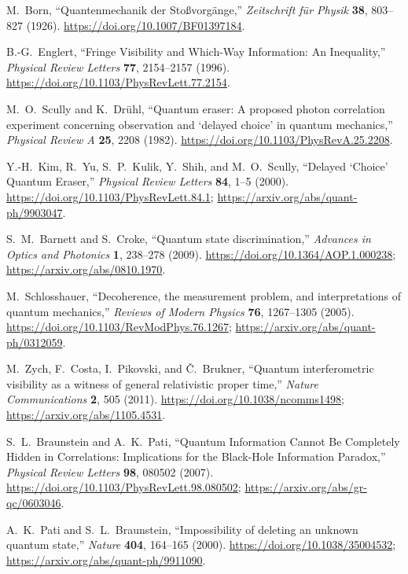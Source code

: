 M.~Born, ``Quantenmechanik der Sto{\ss}vorg{\"a}nge,''
\emph{Zeitschrift f{\"u}r Physik} \textbf{38}, 803--827 (1926).
\url{https://doi.org/10.1007/BF01397184}.

B.-G.~Englert, ``Fringe Visibility and Which-Way Information: An Inequality,''
\emph{Physical Review Letters} \textbf{77}, 2154--2157 (1996).
\url{https://doi.org/10.1103/PhysRevLett.77.2154}.

M.~O.~Scully and K.~Dr{\"u}hl, ``Quantum eraser: A proposed photon correlation experiment concerning observation and `delayed choice' in quantum mechanics,''
\emph{Physical Review A} \textbf{25}, 2208 (1982).
\url{https://doi.org/10.1103/PhysRevA.25.2208}.

Y.-H.~Kim, R.~Yu, S.~P.~Kulik, Y.~Shih, and M.~O.~Scully,
``Delayed `Choice' Quantum Eraser,'' \emph{Physical Review Letters} \textbf{84}, 1--5 (2000).
\url{https://doi.org/10.1103/PhysRevLett.84.1};
\url{https://arxiv.org/abs/quant-ph/9903047}.

S.~M.~Barnett and S.~Croke, ``Quantum state discrimination,''
\emph{Advances in Optics and Photonics} \textbf{1}, 238--278 (2009).
\url{https://doi.org/10.1364/AOP.1.000238};
\url{https://arxiv.org/abs/0810.1970}.

M.~Schlosshauer, ``Decoherence, the measurement problem, and interpretations of quantum mechanics,''
\emph{Reviews of Modern Physics} \textbf{76}, 1267--1305 (2005).
\url{https://doi.org/10.1103/RevModPhys.76.1267};
\url{https://arxiv.org/abs/quant-ph/0312059}.

M.~Zych, F.~Costa, I.~Pikovski, and \v{C}.~Brukner,
``Quantum interferometric visibility as a witness of general relativistic proper time,''
\emph{Nature Communications} \textbf{2}, 505 (2011).
\url{https://doi.org/10.1038/ncomms1498};
\url{https://arxiv.org/abs/1105.4531}.

S.~L.~Braunstein and A.~K.~Pati,
``Quantum Information Cannot Be Completely Hidden in Correlations: Implications for the Black-Hole Information Paradox,''
\emph{Physical Review Letters} \textbf{98}, 080502 (2007).
\url{https://doi.org/10.1103/PhysRevLett.98.080502};
\url{https://arxiv.org/abs/gr-qc/0603046}.

A.~K.~Pati and S.~L.~Braunstein, ``Impossibility of deleting an unknown quantum state,''
\emph{Nature} \textbf{404}, 164--165 (2000).
\url{https://doi.org/10.1038/35004532};
\url{https://arxiv.org/abs/quant-ph/9911090}.

